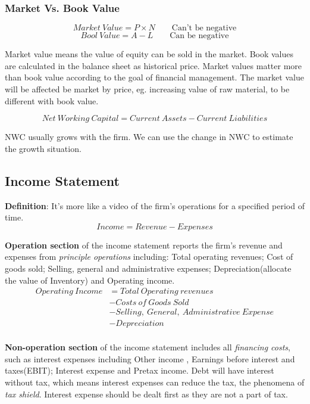 \documentclass[10pt, a4paper]{article}
\begin{document}
        \subsubsection{Market Vs. Book Value}
            $$Market\ Value = P \times N \quad\quad \text{Can't be negative}$$ 
            $$Bool\ Value = A - L \quad\quad \text{Can be negative}$$

            Market value means the value of equity can be sold in the market. Book values are calculated in the balance sheet as historical price. Market values matter more than book value according to the goal of financial management. The market value will be affected be market by price, eg. increasing value of raw material, to be different with book value. 

            $$Net\ Working\ Capital = Current\ Assets - Current\ Liabilities$$

            NWC usually grows with the firm. We can use the change in NWC to estimate the growth situation.

    \subsection{Income Statement}
        \textbf{Definition}: It's more like a video of the firm's operations for a specified period of time. 
        $$Income = Revenue - Expenses$$

        \textbf{Operation section} of the income statement reports the firm's revenue and expenses from \emph{principle operations} including: Total operating revenues; Cost of goods sold; Selling, general and administrative expenses; Depreciation(allocate the value of Inventory) and Operating income.
        \begin{align*}
            Operating\ Income &= Total\ Operating\ revenues \\   
                              &- Costs\ of\ Goods\ Sold \\
                              &- Selling,\ General,\ Administrative\ Expense\\
                              &- Depreciation \\
        \end{align*}

        \textbf{Non-operation section} of the income statement includes all \emph{financing costs}, such as interest expenses including Other income , Earnings before interest and taxes(EBIT); Interest expense and Pretax income. Debt will have interest without tax, which means interest expenses can reduce the tax, the phenomena of \emph{tax shield}. Interest expense should be dealt first as they are not a part of tax. 
\end{document}
